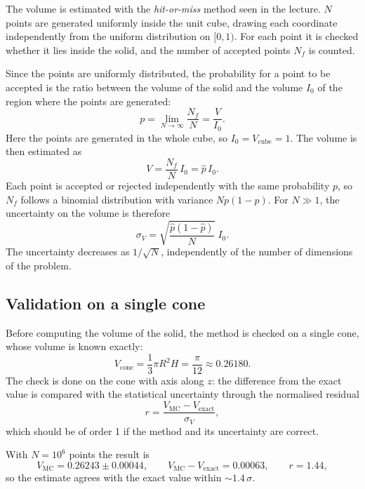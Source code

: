 \documentclass[11pt,a4paper]{article}
\begin{document}
	The volume is estimated with the \textit{hit-or-miss} method seen in the lecture.
	$N$ points are generated uniformly inside the unit cube, drawing each coordinate independently from the uniform distribution on $[0, 1)$.
	For each point it is checked whether it lies inside the solid, and the number of accepted points $N_f$ is counted.

	Since the points are uniformly distributed, the probability for a point to be accepted is the ratio between the volume of the solid and the volume $I_0$ of the region where the points are generated:
	\begin{equation}
		p = \lim_{N \to \infty} \frac{N_f}{N} = \frac{V}{I_0}.
	\end{equation}
	Here the points are generated in the whole cube, so $I_0 = V_{\text{cube}} = 1$.
	The volume is then estimated as
	\begin{equation}
		V = \frac{N_f}{N} \, I_0 = \hat{p} \, I_0 .
	\end{equation}
	Each point is accepted or rejected independently with the same probability $p$, so $N_f$ follows a binomial distribution with variance $N p (1 - p)$.
	For $N \gg 1$, the uncertainty on the volume is therefore
	\begin{equation}
		\sigma_V = \sqrt{\frac{\hat{p}(1 - \hat{p})}{N}} \; I_0 .
		\label{eq:sigma}
	\end{equation}
	The uncertainty decreases as $1/\sqrt{N}$, independently of the number of dimensions of the problem.

	\subsection*{Validation on a single cone}

	Before computing the volume of the solid, the method is checked on a single cone, whose volume is known exactly:
	\begin{equation}
		V_{\text{cone}} = \frac{1}{3} \pi R^2 H = \frac{\pi}{12} \approx 0.26180 .
	\end{equation}
	The check is done on the cone with axis along $z$: the difference from the exact value is compared with the statistical uncertainty through the normalised residual
	\begin{equation}
		r = \frac{V_{\text{MC}} - V_{\text{exact}}}{\sigma_V} ,
	\end{equation}
	which should be of order 1 if the method and its uncertainty are correct.
	
	With $N = 10^6$ points the result is
	\begin{equation}
		V_{\text{MC}} = 0.26243 \pm 0.00044, \qquad V_{\text{MC}} - V_{\text{exact}} = 0.00063, \qquad r = 1.44 ,
	\end{equation}
	so the estimate agrees with the exact value within $\sim 1.4\,\sigma$.
\end{document}
